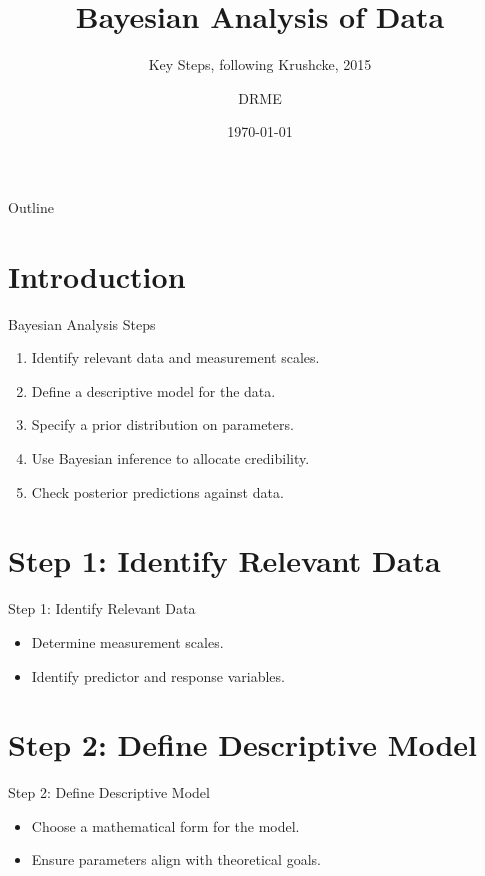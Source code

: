 \documentclass{beamer}
\begin{document}
\title{Bayesian Analysis of Data}
\subtitle{Key Steps, following Krushcke, 2015}
\author{DRME}
\date{\today}

\begin{frame}
  \titlepage
\end{frame}

\begin{frame}{Outline}
  \tableofcontents
\end{frame}

\section{Introduction}

\begin{frame}{Bayesian Analysis Steps}
  \begin{enumerate}
    \item Identify relevant data and measurement scales.
    \item Define a descriptive model for the data.
    \item Specify a prior distribution on parameters.
    \item Use Bayesian inference to allocate credibility.
    \item Check posterior predictions against data.
  \end{enumerate}
\end{frame}

\section{Step 1: Identify Relevant Data}

\begin{frame}{Step 1: Identify Relevant Data}
  \begin{itemize}
    \item Determine measurement scales.
    \item Identify predictor and response variables.
  \end{itemize}
\end{frame}

\section{Step 2: Define Descriptive Model}

\begin{frame}{Step 2: Define Descriptive Model}
  \begin{itemize}
    \item Choose a mathematical form for the model.
    \item Ensure parameters align with theoretical goals.
  \end{itemize}
\end{frame}
\end{document}

